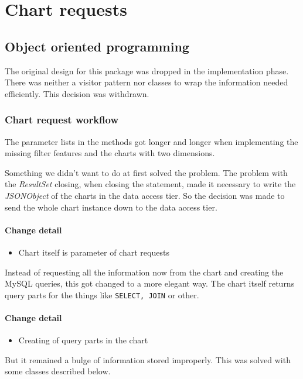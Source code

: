 \section{Chart requests}

\subsection{Object oriented programming}
The original design for this package was dropped in the implementation phase.
There was neither a visitor pattern nor classes to wrap the information
needed efficiently. This decision was withdrawn.

\subsubsection{Chart request workflow} \label{chart}
The parameter lists in the methods got longer 
and longer when implementing the missing filter features
and the charts with two dimensions.

Something we didn't want to do at first solved the problem. The problem 
with the \textit{ResultSet} closing, when closing the statement, made it
necessary to write the \textit{JSONObject} of the charts in the
data access tier. So the decision was made to send the whole chart instance
down to the data access tier. 

\paragraph{Change detail}
\begin{itemize}
  \item Chart itself is parameter of chart requests
\end{itemize}

Instead of requesting all the information now from the chart
and creating the MySQL queries, this got changed to a more elegant way.
The chart itself returns query parts for the things like \texttt{SELECT, JOIN} or other.

\paragraph{Change detail}
\begin{itemize}
  \item Creating of query parts in the chart
\end{itemize}

But it remained a bulge of information stored improperly. This was
solved with some classes described below.

